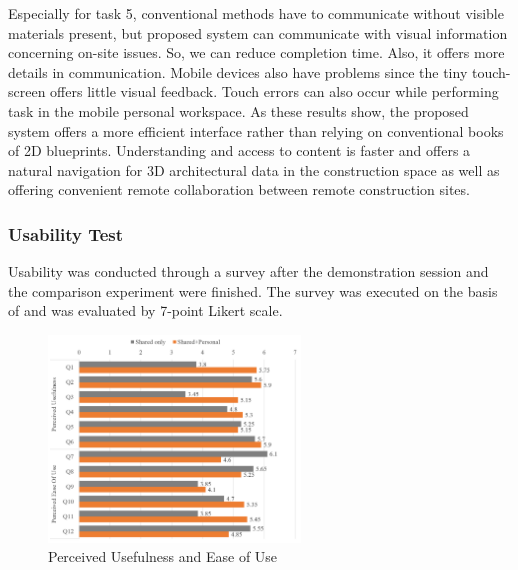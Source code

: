 Especially for task 5, conventional methods have to communicate without visible materials present, but proposed system can communicate with visual information concerning on-site issues. So, we can reduce completion time. Also, it offers more details in communication. Mobile devices also have problems since the tiny touch-screen offers little visual feedback. Touch errors can also occur while performing task in the mobile personal workspace. As these results show, the proposed system offers a more efficient interface rather than relying on conventional books of 2D blueprints. Understanding and access to content is faster and offers a natural navigation for 3D architectural data in the construction space as well as offering convenient remote collaboration between remote construction sites.




\subsubsection{Usability Test}

Usability was conducted through a survey after the demonstration session and the comparison experiment were finished. The survey was executed on the basis of \cite{perlman_user_2011} and was evaluated by 7-point Likert scale. 

 \begin{figure}[b!]
\centering
\includegraphics[width=1.0\columnwidth, height=5.5cm]{5-Experiments/pueu}
\caption{Perceived Usefulness and Ease of Use}
\label{fig:pueu}
\end{figure}

